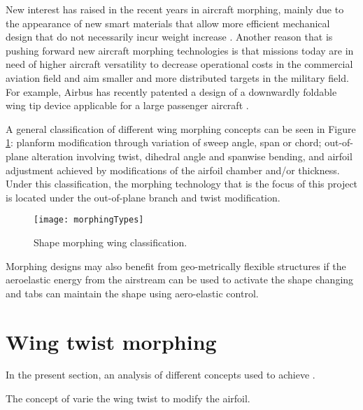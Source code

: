 New interest has raised in the recent years in aircraft morphing, mainly due to the appearance of new smart materials that allow more efficient mechanical design that do not necessarily incur weight increase \cite{Lloyd2007}. Another reason that is pushing forward new aircraft morphing technologies is that missions today are in need of higher aircraft versatility to decrease operational costs in the commercial aviation field and aim smaller and more distributed targets in the military field. For example, Airbus has recently patented a design of a downwardly foldable wing tip device applicable for a large passenger aircraft \cite{Boye2015}.

A general classification of different wing morphing concepts can be seen in Figure \ref{fig:morphingTypes}: planform modification through variation of sweep angle, span or chord; out-of-plane alteration involving twist, dihedral angle and spanwise bending, and airfoil adjustment achieved by modifications of the airfoil chamber and/or thickness. Under this classification, the morphing technology that is the focus of this project is located under the out-of-plane branch and twist modification.
 

\begin{figure}[!htpb]
  \centering
  \texttt{[image: morphingTypes]}
  \caption[Shape morphing wing classification]{Shape morphing wing classification. \cite{Barbarino2011}}\label{fig:morphingTypes}
\end{figure}

Morphing designs may also benefit from geo-metrically flexible structures if the aeroelastic energy from the airstream can be used to activate the shape changing and tabs can maintain the shape using aero-elastic control.


\section{Wing twist morphing} \label{sec:twist_state}

In the present section, an analysis of different concepts used to achieve .

The concept of varie the wing twist to modify the airfoil. 
